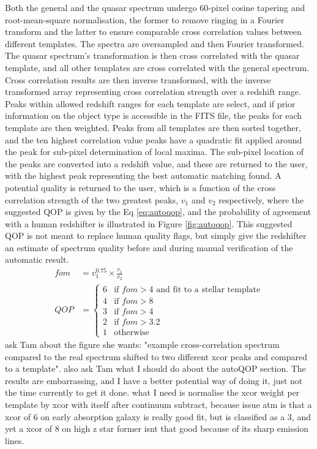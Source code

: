 \documentclass[iop]{emulateapj}
\newcommand{\green}{\color{LimeGreen}}
\begin{document}
Both the general and the quasar spectrum undergo 60-pixel cosine tapering and root-mean-square normalisation, the former to remove ringing in a Fourier transform and the latter to ensure comparable cross correlation values between different templates. The spectra are oversampled and then Fourier transformed. The quasar spectrum's transformation is then cross correlated with the quasar template, and all other templates are cross correlated with the general spectrum. Cross correlation results are then inverse transformed, with the inverse transformed array representing cross correlation strength over a redshift range. Peaks within allowed redshift ranges for each template are select, and if prior information on the object type is accessible in the FITS file, the peaks for each template are then weighted. Peaks from all templates are then sorted together, and the ten highest correlation value peaks have a quadratic fit applied around the peak for sub-pixel determination of local maxima. The sub-pixel location of the peaks are converted into a redshift value, and these are returned to the user, with the highest peak representing the best automatic matching found. A potential quality is returned to the user, which is a function of the cross correlation strength of the two greatest peaks, $v_1$ and $v_2$ respectively, where the suggested QOP is given by the Eq \eqref{eq:autoqop}, and the probability of agreement with a human redshifter is illustrated in Figure \ref{fig:autoqop}. This suggested QOP is not meant to replace human quality flags, but simply give the redshifter an estimate of spectrum quality before and during manual verification of the automatic result.
\begin{align}
fom &= v_1^{0.75} \times \frac{v_1}{v_2} \\
QOP &= \begin{cases}6 & \text{if } fom > 4 \text{ and fit to a stellar template} \label{eq:autoqop}\\
4 & \text{if } fom > 8  \\
3 & \text{if } fom > 4 \\
2 & \text{if } fom > 3.2 \\
1 & \text{otherwise} \end{cases}
\end{align}
{\green ask Tam about the figure she wants: "example cross-correlation spectrum compared to the real spectrum shifted to two different xcor peaks and compared to a template". also ask Tam what I should do about the autoQOP section. The results are embarrassing, and I have a better potential way of doing it, just not the time currently to get it done. what I need is normalise the xcor weight per template by xcor with itself after continuum subtract, because issue atm is that a xcor of 6 on early absorption galaxy is really good fit, but is classified as a 3, and yet a xcor of 8 on high z star former isnt that good because of its sharp emission lines. }
\end{document}
